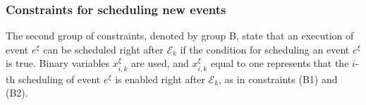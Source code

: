 \documentclass[]{interact}
\theoremstyle{plain}%
\theoremstyle{definition}
\theoremstyle{remark}
\begin{document}



\subsubsection{Constraints for scheduling new events}\label{sec:const_C}
The second group of constraints, denoted by group B, state that an execution of event $e^{\xi}$ can be scheduled right after $\mathcal{E}_k$ if the condition for scheduling an event $e^{\xi}$ is true. Binary variables $x^{\xi}_{i,k}$ are used, and $x^{\xi}_{i,k}$ equal to one represents that the $i$-th scheduling of event $e^{\xi}$ is enabled right after $\mathcal{E}_k$, as in constraints (B1) and (B2). 
\end{document}
